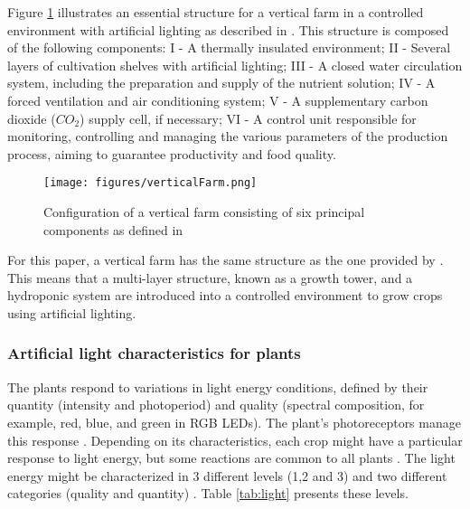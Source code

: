 \documentclass[preprint, review, 12pt]{elsarticle}
\begin{document}
Figure \ref{fig:verticalFarm} illustrates an essential structure for a vertical farm in a controlled environment with artificial lighting as described in \cite{kozai2020}. This structure is composed of the following components: I - A thermally insulated environment; II - Several layers of cultivation shelves with artificial lighting; III - A closed water circulation system, including the preparation and supply of the nutrient solution; IV - A forced ventilation and air conditioning system; V - A supplementary carbon dioxide ($CO_2$) supply cell, if necessary; VI - A control unit responsible for monitoring, controlling and managing the various parameters of the production process, aiming to guarantee productivity and food quality.

\begin{figure}[htbp]
    \centering
    \texttt{[image: figures/verticalFarm.png]}
    \caption{Configuration of a vertical farm consisting of six principal components as defined in \cite{kozai2020}}
    \label{fig:verticalFarm}
\end{figure}

For this paper, a vertical farm has the same structure as the one provided by \cite{kozai2020}. This means that a multi-layer structure, known as a growth tower, and a hydroponic system are introduced into a controlled environment to grow crops using artificial lighting. 

\subsubsection{Artificial light characteristics for plants}

The plants respond to variations in light energy conditions, defined by their quantity (intensity and photoperiod) and quality (spectral composition, for example, red, blue, and green in RGB LEDs). The plant's photoreceptors manage this response \cite{kami2010}. Depending on its characteristics, each crop might have a particular response to light energy, but some reactions are common to all plants \cite{paradiso2022}. The light energy might be characterized in 3 different levels (1,2 and 3) and two different categories (quality and quantity) \cite{boros2023a, FUJIWARA202283}. Table \ref{tab:light} presents these levels. 
\end{document}
